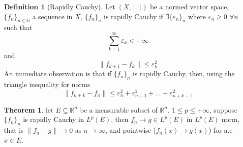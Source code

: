 \documentclass[12pt]{article}
\theoremstyle{definition}
\newtheorem{theorem}{Theorem}[section]
\newtheorem{definition}{Definition}[section]
\begin{document}
	\begin{definition}[Rapidly Cauchy]
		Let $(X,||.||)$ be a normed vector space, $\{f_n\}_{n \in \mathbb{N}}$ a sequence in $X$, $\{f_n\}_n$ is rapidly Cauchy if $\exists \{\varepsilon_{n}\}_n$ where $\varepsilon_n \geq 0$ $\forall n$ such that 
		$$ \sum_{k=1}^\infty \varepsilon_k < +\infty$$
		and
		$$ \| f_{k+1} - f_k \| \leq \varepsilon_k^2 $$
		An immediate observation is that if $\{f_n\}_n$ is rapidly Cauchy, then, using the triangle inequality for norms
		$$
		\|f_{n+k} - f_n \| \leq \varepsilon^2_n + \varepsilon^2_{n+1} + \ldots + \varepsilon^2_{n+k-1}
		$$

	\end{definition}
	\begin{theorem}
		\label{thm:lpeconv}
		let $E \subseteq \mathbb{R}^n$ be a measurable subset of $\mathbb{R}^n$, $1 \leq p \leq +\infty$, suppose $\{f_n\}_n$ is rapidly Cauchy in $L^p(E)$, then $f_n \to g \in L^p(E)$ in $L^p(E)$ norm, that is $\| f_n - g \| \to 0$ as $n \to \infty$, and pointwise ($f_n(x) \to g(x)$) for a.e $x \in E$. 
	\end{theorem}
\end{document}
